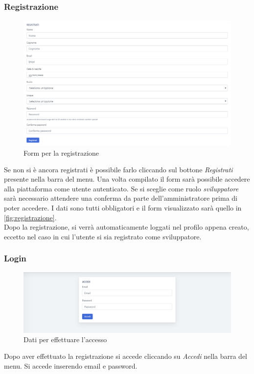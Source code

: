     \subsubsection{Registrazione}
    	\begin{figure}[H]
        	\centering
        	\includegraphics[width=1\linewidth]{sez/img/autenticazione/formRegistrazione.PNG} 
        	\caption{Form per la registrazione}\label{fig:registrazione}
    	\end{figure}
	  Se non si è ancora registrati è possibile farlo cliccando sul bottone \textit{Registrati} presente nella barra del menu. Una volta compilato il form sarà possibile accedere alla piattaforma come utente autenticato. Se si sceglie come ruolo \textit{sviluppatore} sarà necessario attendere una conferma da parte dell'amministratore prima di poter accedere. I dati sono tutti obbligatori e il form visualizzato sarà quello in \autoref{fig:registrazione}.\\
	  Dopo la registrazione, si verrà automaticamente loggati nel profilo appena creato, eccetto nel caso in cui l'utente si sia registrato come sviluppatore.
    \subsubsection{Login}
    	\begin{figure}[H]
        	\centering
        	\includegraphics[width=1\linewidth]{sez/img/autenticazione/formAccedi.PNG} 
        	\caption{Dati per effettuare l'accesso}\label{fig:1}
    	\end{figure}
 	  Dopo aver effettuato la registrazione si accede cliccando su \textit{Accedi} nella barra del menu. Si accede inserendo email e password.


